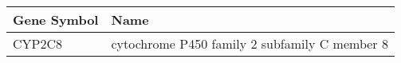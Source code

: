 \begin{tabular}{ll}
\toprule
Gene Symbol &                                          Name \\
\midrule
     CYP2C8 & cytochrome P450 family 2 subfamily C member 8 \\
\bottomrule
\end{tabular}
